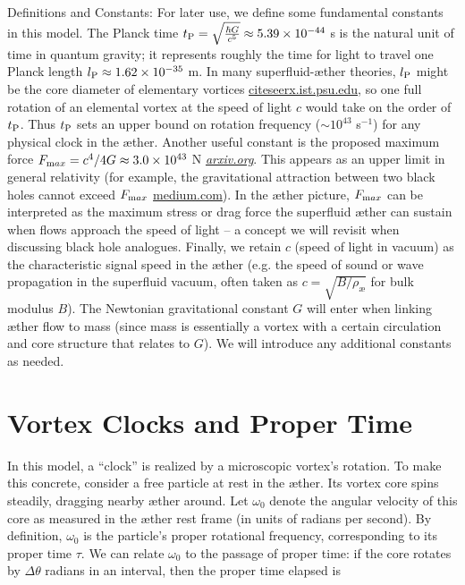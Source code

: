 \documentclass[aps,preprint,superscriptaddress]{revtex4}
\begin{document}
    Definitions and Constants: For later use, we define some fundamental constants in this model. The Planck time $t_{\textrm P} = \sqrt{\frac{\hbar G}{c^5}} \approx 5.39\times10^{-44}$ s is the natural unit of time in quantum gravity; it represents roughly the time for light to travel one Planck length $l_{\textrm P}\approx1.62\times10^{-35}$ m. In many superfluid-æther theories, $l_{\textrm P}$ might be the core diameter of elementary vortices
    \href{https://citeseerx.ist.psu.edu/document?repid=rep1&type=pdf&doi=25483f1ebc9dc442a9f1505a49d96eb35e92e3f4#:~:text=45,on%20General%20Relativity%20and%20Relativistic}{citeseerx.ist.psu.edu}, so one full rotation of an elemental vortex at the speed of light $c$ would take on the order of $t_{\textrm P}$. Thus $t_{\textrm P}$ sets an upper bound on rotation frequency ($\sim10^{43}$ s$^{-1}$) for any physical clock in the æther. Another useful constant is the proposed maximum force $F_{\textrm max}=c^4/4G \approx 3.0\times10^{43}$ N
    \href{https://arxiv.org/abs/2205.06302#:~:text=the%20principle%20of%20maximum%20force,The%20limits%20illuminate}{\textit{arxiv.org}}. This appears as an upper limit in general relativity (for example, the gravitational attraction between two black holes cannot exceed $F_{\textrm max}$
    \href{https://medium.com/@motionmountain/4-there-is-a-maximum-force-in-nature-d87e1951e9a4#:~:text=,implies%20inverse%20square%20gravity}{medium.com}). In the æther picture, $F_{\textrm max}$ can be interpreted as the maximum stress or drag force the superfluid æther can sustain when flows approach the speed of light – a concept we will revisit when discussing black hole analogues. Finally, we retain $c$ (speed of light in vacuum) as the characteristic signal speed in the æther (e.g. the speed of sound or wave propagation in the superfluid vacuum, often taken as $c=\sqrt{B/\rho_\text{\ae}}$ for bulk modulus $B$). The Newtonian gravitational constant $G$ will enter when linking æther flow to mass (since mass is essentially a vortex with a certain circulation and core structure that relates to $G$). We will introduce any additional constants as needed.


\section*{Vortex Clocks and Proper Time}

In this model, a “clock” is realized by a microscopic vortex’s rotation. To make this concrete, consider a free particle at rest in the æther. Its vortex core spins steadily, dragging nearby æther around. Let $\omega_0$ denote the angular velocity of this core as measured in the æther rest frame (in units of radians per second). By definition, $\omega_0$ is the particle’s proper rotational frequency, corresponding to its proper time $\tau$. We can relate $\omega_0$ to the passage of proper time: if the core rotates by $\Delta \theta$ radians in an interval, then the proper time elapsed is
\end{document}
